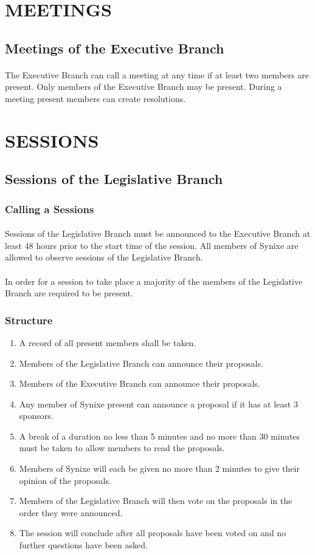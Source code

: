 \documentclass[10pt,a4paper]{article}
\begin{document}
\section{MEETINGS}
\subsection{Meetings of the Executive Branch}
\paragraph{}
The Executive Branch can call a meeting at any time if at least two members are present. Only members of the Executive Branch may be present. During a meeting present members can create resolutions.
\section{SESSIONS}
\subsection{Sessions of the Legislative Branch}
\subsubsection{Calling a Sessions}
\paragraph{}
Sessions of the Legislative Branch must be announced to the Executive Branch at least 48 hours prior to the start time of the session. All members of Synixe are allowed to observe sessions of the Legislative Branch.
\paragraph{}
In order for a session to take place a majority of the members of the Legislative Branch are required to be present.
\subsubsection{Structure}
\begin{enumerate}
	\item A record of all present members shall be taken.
	\item Members of the Legislative Branch can announce their proposals.
	\item Members of the Executive Branch can announce their proposals.
	\item Any member of Synixe present can announce a proposal if it has at least 3 sponsors.
	\item A break of a duration no less than 5 minutes and no more than 30 minutes must be taken to allow members to read the proposals.
	\item Members of Synixe will each be given no more than 2 minutes to give their opinion of the proposals.
	\item Members of the Legislative Branch will then vote on the proposals in the order they were announced.
	\item The session will conclude after all proposals have been voted on and no further questions have been asked.
\end{enumerate}
\end{document}
